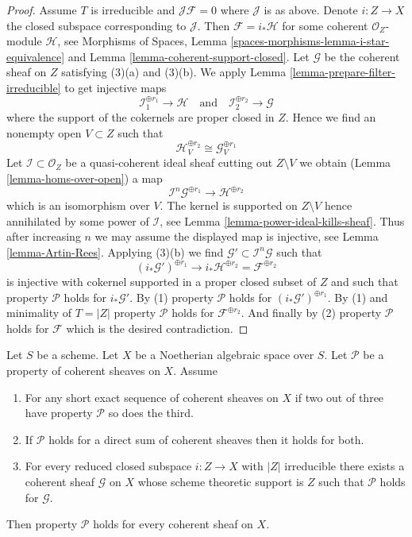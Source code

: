 \begin{proof}
\medskip\noindent
Assume $T$ is irreducible and $\mathcal{J}\mathcal{F} = 0$ where
$\mathcal{J}$ is as above. Denote $i : Z \to X$ the closed subspace
corresponding to $\mathcal{J}$. Then $\mathcal{F} = i_*\mathcal{H}$
for some coherent $\mathcal{O}_Z$-module $\mathcal{H}$, see
Morphisms of Spaces, Lemma \ref{spaces-morphisms-lemma-i-star-equivalence}
and Lemma \ref{lemma-coherent-support-closed}.
Let $\mathcal{G}$ be the coherent sheaf on $Z$ satisfying
(3)(a) and (3)(b). We apply Lemma \ref{lemma-prepare-filter-irreducible}
to get injective maps
$$
\mathcal{I}_1^{\oplus r_1} \to \mathcal{H}
\quad\text{and}\quad
\mathcal{I}_2^{\oplus r_2} \to \mathcal{G}
$$
where the support of the cokernels are proper closed in $Z$. Hence we find
an nonempty open $V \subset Z$ such that
$$
\mathcal{H}^{\oplus r_2}_V \cong \mathcal{G}^{\oplus r_1}_V
$$
Let $\mathcal{I} \subset \mathcal{O}_Z$ be a quasi-coherent ideal sheaf
cutting out $Z \setminus V$ we obtain
(Lemma \ref{lemma-homs-over-open})
a map
$$
\mathcal{I}^n\mathcal{G}^{\oplus r_1} \longrightarrow \mathcal{H}^{\oplus r_2}
$$
which is an isomorphism over $V$. The kernel is supported on $Z \setminus V$
hence annihilated by some power of $\mathcal{I}$, see
Lemma \ref{lemma-power-ideal-kills-sheaf}. Thus after increasing
$n$ we may assume the displayed map is injective, see
Lemma \ref{lemma-Artin-Rees}. Applying (3)(b) we find
$\mathcal{G}' \subset \mathcal{I}^n\mathcal{G}$ such that
$$
(i_*\mathcal{G}')^{\oplus r_1} \longrightarrow
i_*\mathcal{H}^{\oplus r_2} = \mathcal{F}^{\oplus r_2}
$$
is injective with cokernel supported in a proper closed subset of $Z$
and such that property $\mathcal{P}$ holds for $i_*\mathcal{G}'$.
By (1) property $\mathcal{P}$ holds for $(i_*\mathcal{G}')^{\oplus r_1}$.
By (1) and minimality of $T = |Z|$ property $\mathcal{P}$ holds for
$\mathcal{F}^{\oplus r_2}$. And finally by (2) property $\mathcal{P}$
holds for $\mathcal{F}$ which is the desired contradiction.
\end{proof}

\begin{lemma}
\label{lemma-property-higher-rank-cohomological-variant}
Let $S$ be a scheme. Let $X$ be a Noetherian algebraic space over $S$.
Let $\mathcal{P}$ be a property of coherent sheaves on $X$. Assume
\begin{enumerate}
\item For any short exact sequence of coherent sheaves on $X$
if two out of three have property $\mathcal{P}$ so does the third.
\item If $\mathcal{P}$ holds for a direct sum of coherent sheaves
then it holds for both.
\item For every reduced closed subspace $i : Z \to X$ with
$|Z|$ irreducible there exists a coherent sheaf $\mathcal{G}$ on $X$
whose scheme theoretic support is $Z$ such that $\mathcal{P}$ holds for
$\mathcal{G}$.
\end{enumerate}
Then property $\mathcal{P}$ holds for every coherent sheaf on $X$.
\end{lemma}

